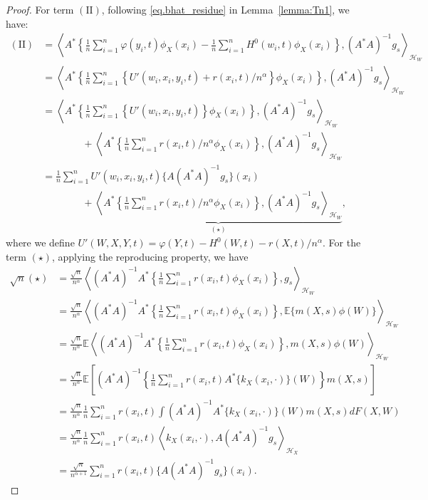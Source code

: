 \documentclass[
  12pt]{article}
\def\cH{\mathcal{H}}
\begin{document}
\begin{proof}
For term $(\mathrm{II})$, following \eqref{eq.bhat_residue} in Lemma~\ref{lemma:Tn1}, we have:
\begin{align*}
	(\mathrm{II}) &= \left\langle A^*\left\{ \frac{1}{n}\sum_{i=1}^n{\varphi (y_i,t)\phi_X(x_i)}-\frac{1}{n}\sum_{i=1}^n{H^0(w_i,t)\phi_X(x_i)} \right\} ,(A^*A)^{-1}g_s \right\rangle_{\cH_W}\\
	&=\left\langle A^*\left\{ \frac{1}{n}\sum_{i=1}^n{\left\{ U'( w_{i},x_i,y_i,t ) +r( x_i,t ) /n^{\alpha} \right\} \phi_X(x_i)} \right\} ,(A^*A)^{-1}g_s \right\rangle_{\cH_W}\\
	&=\left\langle A^*\left\{ \frac{1}{n}\sum_{i=1}^n{\left\{ U'( w_{i},x_i,y_i,t ) \right\} \phi_X(x_i)} \right\} ,(A^*A)^{-1}g_s \right\rangle_{\cH_W}\\
    &\qquad\qquad+\left\langle A^*\left\{ \frac{1}{n}\sum_{i=1}^n{r( x_i,t ) /n^{\alpha}\phi_X(x_i)} \right\} ,(A^*A)^{-1}g_s \right\rangle_{\cH_W}\\
    &=\frac{1}{n}\sum_{i=1}^{n}U'(w_{i},x_i,y_{i},t)\{A(A^{*}A)^{-1}g_{s}\}(x_{i}) \\
    & \qquad \qquad + \underbrace{\left\langle A^*\left\{ \frac{1}{n}\sum_{i=1}^n{r( x_i,t ) /n^{\alpha}\phi_X(x_i)} \right\} ,(A^*A)^{-1}g_s \right\rangle_{\cH_W}}_{(\star)},
\end{align*}
where we define $U'(W,X,Y,t)=\varphi(Y,t)-H^0(W,t)-r(X,t)/n^{\alpha}$. For the term $(\star)$, applying the reproducing property, we have
\begin{align*}
\sqrt{n} (\star)&=\frac{\sqrt{n}}{n^{\alpha}}\left\langle (A^*A)^{-1}A^*\left\{ \frac{1}{n}\sum_{i=1}^n{r( x_i,t )\phi_X(x_i)} \right\} ,g_s \right\rangle_{\cH_W}\\
&=\frac{\sqrt{n}}{n^{\alpha}}\left\langle (A^*A)^{-1}A^*\left\{ \frac{1}{n}\sum_{i=1}^n{r( x_i,t )\phi_X(x_i)} \right\} ,\mathbb{E}\{m(X,s)\phi(W)\} \right\rangle_{\cH_W}\\
&=\frac{\sqrt{n}}{n^{\alpha}}\mathbb{E}\left\langle (A^*A)^{-1}A^*\left\{ \frac{1}{n}\sum_{i=1}^n{r( x_i,t )\phi_X(x_i)} \right\} ,m(X,s)\phi(W) \right\rangle_{\cH_W}\\
    &=\frac{\sqrt{n}}{n^{\alpha}}\mathbb{E} \left[ (A^*A)^{-1}\left\{ \frac{1}{n}\sum_{i=1}^n{r(x_i,t) A^*\{ k_X( x_i,\cdot ) \}(W)} \right\} m(X,s) \right]\\
    &=\frac{\sqrt{n}}{n^{\alpha}}   \frac{1}{n}\sum_{i=1}^n r(x_i,t) \int  (A^*A)^{-1}A^*\{ k_X( x_i,\cdot ) \}(W)   m(X,s)dF(X,W) \\
     &=\frac{\sqrt{n}}{n^{\alpha}}   \frac{1}{n}\sum_{i=1}^n r(x_i,t) \left\langle k_X( x_i,\cdot ) ,   A(A^*A)^{-1}g_s\right\rangle_{\cH_X} \\
    &=\frac{\sqrt{n}}{n^{\alpha+1}}\sum_{i=1}^n{r(x_i,t) \{A(A^*A)^{-1}g_s\}(x_i)}.
\end{align*}


\end{proof}
\end{document}
